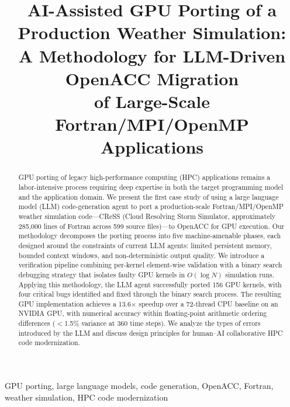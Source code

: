 \documentclass[conference]{IEEEtran}
\begin{document}
\title{AI-Assisted GPU Porting of a Production Weather Simulation:\\
A Methodology for LLM-Driven OpenACC Migration\\of Large-Scale Fortran/MPI/OpenMP Applications}

\author{
}

\maketitle

\begin{abstract}
GPU porting of legacy high-performance computing (HPC) applications remains a
labor-intensive process requiring deep expertise in both the target programming
model and the application domain. We present the first case study of using a
large language model (LLM) code-generation agent to port a production-scale
Fortran/MPI/OpenMP weather simulation code---CReSS (Cloud Resolving Storm
Simulator, approximately 285,000 lines of Fortran across 599 source
files)---to OpenACC for GPU execution. Our methodology decomposes the porting
process into five machine-amenable phases, each designed around the
constraints of current LLM agents: limited persistent memory, bounded context
windows, and non-deterministic output quality. We introduce a verification
pipeline combining per-kernel element-wise validation with a binary search
debugging strategy that isolates faulty GPU kernels in $O(\log N)$ simulation
runs. Applying this methodology, the LLM agent successfully ported 156 GPU
kernels, with four critical bugs identified and fixed through the binary
search process. The resulting GPU implementation achieves a 13.6$\times$
speedup over a 72-thread CPU baseline on an NVIDIA GPU, with numerical
accuracy within floating-point arithmetic ordering differences ($<$1.5\%
variance at 360 time steps). We analyze the types of errors introduced by the
LLM and discuss design principles for human--AI collaborative HPC code
modernization.
\end{abstract}

\begin{IEEEkeywords}
GPU porting, large language models, code generation, OpenACC, Fortran,
weather simulation, HPC code modernization
\end{IEEEkeywords}
\end{document}
